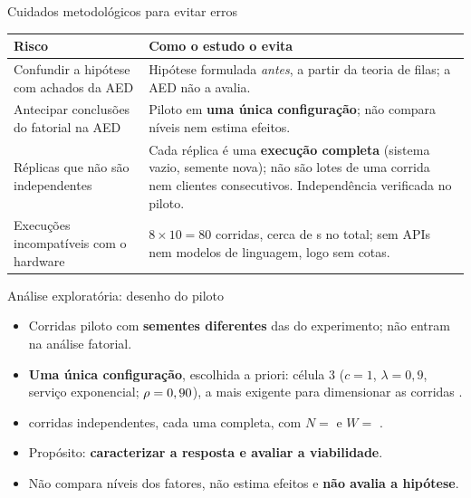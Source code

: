 \documentclass[aspectratio=169,11pt]{beamer}
\newcommand{\destaque}[1]{{\color{azul}\bfseries #1}}
\begin{document}
\begin{frame}{Cuidados metodológicos para evitar erros}
  \small
  \begin{tabular}{@{}p{}p{}@{}}
    \toprule
    \textbf{Risco} & \textbf{Como o estudo o evita} \\
    \midrule
    Confundir a hipótese com achados da AED & Hipótese formulada \emph{antes}, a partir da teoria de filas; a AED não a avalia. \\[4pt]
    Antecipar conclusões do fatorial na AED & Piloto em \destaque{uma única configuração}; não compara níveis nem estima efeitos. \\[4pt]
    Réplicas que não são independentes & Cada réplica é uma \destaque{execução completa} (sistema vazio, semente nova); não são lotes de uma corrida nem clientes consecutivos. Independência verificada no piloto. \\[4pt]
    Execuções incompatíveis com o hardware & $8 \times 10 = 80$ corridas, cerca de \TempoTotalEstimado{} s no total; sem APIs nem modelos de linguagem, logo sem cotas. \\
    \bottomrule
  \end{tabular}
\end{frame}

\begin{frame}{Análise exploratória: desenho do piloto}
  \begin{itemize}
    \setlength{\itemsep}{6pt}
    \item Corridas piloto com \destaque{sementes diferentes} das do experimento; não entram na análise fatorial.
    \item \destaque{Uma única configuração}, escolhida a priori: célula 3 ($c = 1$, $\lambda = 0{,}9$, serviço exponencial; $\rho = 0,90{}$), a mais exigente para dimensionar as corridas \parencite{kelton1985,law2000}.
    \item \RPiloto{} corridas independentes, cada uma completa, com $N = $ \NClientes{} e $W = $ \Aquecimento{}.
    \item Propósito: \destaque{caracterizar a resposta e avaliar a viabilidade}.
    \item Não compara níveis dos fatores, não estima efeitos e \destaque{não avalia a hipótese}.
  \end{itemize}
\end{frame}
\end{document}
